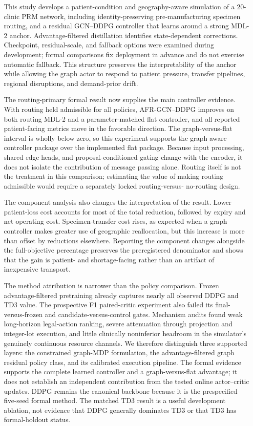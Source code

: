\documentclass[preprint,review,12pt]{elsarticle}
\begin{document}
This study develops a patient-condition and geography-aware simulation of a
20-clinic PRM network, including identity-preserving pre-manufacturing specimen
routing, and a residual GCN--DDPG controller that learns around a
strong MDL-2 anchor. Advantage-filtered distillation identifies
state-dependent corrections. Checkpoint, residual-scale, and fallback options
were examined during development; formal comparisons fix deployment in
advance and do not exercise automatic fallback. This structure preserves the interpretability of the anchor while
allowing the graph actor to respond to patient pressure, transfer pipelines,
regional disruptions, and demand-prior drift.

The routing-primary formal result now supplies the main controller evidence.
With routing held admissible for all policies, AFR-GCN--DDPG improves on both
routing MDL-2 and a parameter-matched flat controller, and all reported
patient-facing metrics move in the favorable direction. The graph-versus-flat
interval is wholly below zero, so this experiment supports the graph-aware
controller package over the implemented flat package. Because input
processing, shared edge heads, and proposal-conditioned gating change with
the encoder, it does not isolate the contribution of message passing alone.
Routing itself is not the treatment in this comparison; estimating the value
of making routing admissible would require a separately locked routing-versus-
no-routing design.

The component analysis also changes the interpretation of the result. Lower
patient-loss cost accounts for most of the total reduction, followed by expiry
and net operating cost. Specimen-transfer cost rises, as expected when a graph
controller makes greater use of geographic reallocation, but this increase is
more than offset by reductions elsewhere. Reporting the component changes
alongside the full-objective percentage preserves the preregistered denominator
and shows that the gain is patient- and shortage-facing rather than an artifact
of inexpensive transport.

The method attribution is narrower than the policy comparison. Frozen
advantage-filtered pretraining already captures nearly all observed DDPG and
TD3 value. The prospective F1 paired-critic experiment also failed its
final-versus-frozen and candidate-versus-control gates. Mechanism audits found
weak long-horizon legal-action ranking, severe attenuation through projection
and integer-lot execution, and little clinically noninferior headroom in the
simulator's genuinely continuous resource channels. We therefore distinguish
three supported layers: the constrained graph-MDP formulation, the
advantage-filtered graph residual policy class, and its calibrated execution
pipeline. The formal evidence supports the complete learned controller and a
graph-versus-flat advantage; it does not establish an independent contribution
from the tested online actor--critic updates. DDPG remains the canonical
backbone because it is the prespecified five-seed formal method. The matched
TD3 result is a useful development ablation, not evidence that DDPG generally
dominates TD3 or that TD3 has formal-holdout status.
\end{document}
